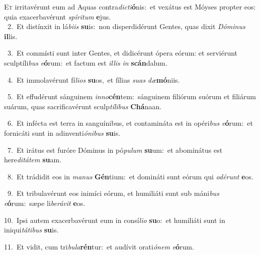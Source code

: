 \lettrine{\initial\textcolor{\initialcolor}{E}}{t} irritavérunt eum ad Aquas contra\-\textit{dic}\-\textit{ti}\textbf{ó}nis:~\star et vexátus est Móyses propter eos: quia exacerbavérunt \textit{spí}\-\textit{ri}\textit{tum} \textbf{e}\-jus.\\
{\numbfont\textcolor{\numbcolor}{~2.}}~Et distínxit in lá\-\textit{bi}\-\textit{is} \textbf{su}\-is:~\star non disperdidérunt Gentes, quas dixit \textit{Dó}\-\textit{mi}\textit{nus} \textbf{il}\-lis.\par
{\numbfont\textcolor{\numbcolor}{~3.}}~Et commísti sunt inter Gentes, et didicérunt ópera eórum: et serviérunt sculptíli\textit{bus} \textit{e}\-\textbf{ó}rum:~\star et factum est \textit{il}\-\textit{lis} \textit{in} \textbf{scán}\-dalum.\par
{\numbfont\textcolor{\numbcolor}{~4.}}~Et immolavérunt fí\-\textit{li}\-\textit{os} \textbf{su}\-os,~\star et fílias \textit{su}\-\textit{as} \textit{dæ}\-\textbf{mó}niis.\par
{\numbfont\textcolor{\numbcolor}{~5.}}~Et effudérunt sánguinem \textit{in}\-\textit{no}\textbf{cén}tem:~\star sánguinem filiórum suórum et filiárum suárum, quas sacrificavérunt sculp\-\textit{tí}\-\textit{li}\textit{bus} \textbf{Chá}\-naan.\par
{\numbfont\textcolor{\numbcolor}{~6.}}~Et infécta est terra in sanguínibus, et contamináta est in opéri\textit{bus} \textit{e}\-\textbf{ó}rum:~\star et fornicáti sunt in adinventi\-\textit{ó}\-\textit{ni}\textit{bus} \textbf{su}\-is.\par
{\numbfont\textcolor{\numbcolor}{~7.}}~Et irátus est furóre Dóminus in pó\-\textit{pu}\-\textit{lum} \textbf{su}\-um:~\star et abominátus est here\-\textit{di}\-\textit{tá}\textit{tem} \textbf{su}\-am.\par
{\numbfont\textcolor{\numbcolor}{~8.}}~Et trádidit eos in \textit{ma}\-\textit{nus} \textbf{Gén}\-tium:~\star et domináti sunt eórum qui \textit{o}\-\textit{dé}\textit{runt} \textbf{e}\-os.\par
{\numbfont\textcolor{\numbcolor}{~9.}}~Et tribulavérunt eos inimíci eórum, et humiliáti sunt sub máni\textit{bus} \textit{e}\-\textbf{ó}rum:~\star sæpe li\-\textit{be}\-\textit{rá}\textit{vit} \textbf{e}\-os.\par
{\numbfont\textcolor{\numbcolor}{10.}}~Ipsi autem exacerbavérunt eum in consí\-\textit{li}\-\textit{o} \textbf{su}\-o:~\star et humiliáti sunt in iniqui\-\textit{tá}\-\textit{ti}\textit{bus} \textbf{su}\-is.\par
{\numbfont\textcolor{\numbcolor}{11.}}~Et vidit, cum tri\-\textit{bu}\-\textit{la}\textbf{rén}tur:~\star et audívit orati\-\textit{ó}\-\textit{nem} \textit{e}\-\textbf{ó}rum.\par
